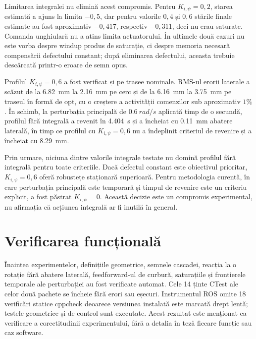 \documentclass[12pt,a4paper,oneside]{report}
\begin{document}
Limitarea integralei nu elimină acest compromis. Pentru $K_{i,\psi}=0{,}2$,
starea estimată a ajuns la limita $-0{,}5$, dar pentru valorile $0{,}4$ și
$0{,}6$ stările finale estimate au fost aproximativ $-0{,}417$, respectiv
$-0{,}311$, deci nu erau saturate. Comanda unghiulară nu a atins limita
actuatorului. În ultimele două cazuri nu este vorba despre windup produs de
saturație, ci despre memoria necesară compensării defectului constant; după
eliminarea defectului, aceasta trebuie descărcată printr-o eroare de semn opus.

Profilul $K_{i,\psi}=0{,}6$ a fost verificat și pe trasee nominale. RMS-ul
erorii laterale a scăzut de la \SI{6.82}{mm} la \SI{2.16}{mm} pe cerc și de la
\SI{6.16}{mm} la \SI{3.75}{mm} pe traseul în formă de opt, cu o creștere a
activității comenzilor sub aproximativ $1\%$. În schimb, la perturbația principală de
$\SI{0.6}{rad/s}$ aplicată timp de o secundă, profilul fără integrală a revenit
în \SI{4.404}{s} și a încheiat cu \SI{0.11}{mm} abatere laterală, în timp ce
profilul cu $K_{i,\psi}=0{,}6$ nu a îndeplinit criteriul de revenire și a
încheiat cu \SI{8.29}{mm}.

Prin urmare, niciuna dintre valorile integrale testate nu domină profilul fără
integrală pentru toate criteriile. Dacă defectul constant este obiectivul
prioritar, $K_{i,\psi}=0{,}6$ oferă robustețe staționară superioară. Pentru
metodologia curentă, în care perturbația principală este temporară și timpul de
revenire este un criteriu explicit, a fost păstrat $K_{i,\psi}=0$. Această
decizie este un compromis experimental, nu afirmația că acțiunea integrală ar
fi inutilă în general.

\section{Verificarea funcțională}

Înaintea experimentelor, definițiile geometrice, semnele cascadei, reacția la o
rotație fără abatere laterală, feedforward-ul de curbură, saturațiile și
frontierele temporale ale perturbației au fost verificate automat. Cele 14 ținte
CTest ale celor două pachete se încheie fără erori sau eșecuri. Instrumentul
ROS omite 18 verificări statice cppcheck deoarece versiunea instalată este
marcată drept lentă; testele geometrice și de control sunt executate. Acest rezultat
este menționat ca verificare a corectitudinii experimentului, fără a detalia în
teză fiecare funcție sau caz software.

\end{document}
